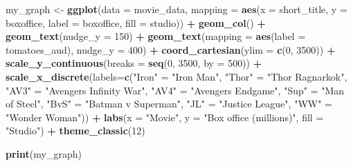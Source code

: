 \documentclass[
]{krantz}
\makeatletter
\newenvironment{Shaded}{\begin{snugshade}}{\end{snugshade}}
\newcommand{\DataTypeTok}[1]{\textcolor[rgb]{0.27,0.27,0.27}{#1}}
\newcommand{\DecValTok}[1]{\textcolor[rgb]{0.06,0.06,0.06}{#1}}
\newcommand{\KeywordTok}[1]{\textcolor[rgb]{0.27,0.27,0.27}{\textbf{#1}}}
\newcommand{\NormalTok}[1]{#1}
\newcommand{\OperatorTok}[1]{\textcolor[rgb]{0.43,0.43,0.43}{\textbf{#1}}}
\newcommand{\StringTok}[1]{\textcolor[rgb]{0.5,0.5,0.5}{#1}}
\newenvironment{kframe}{%
\medskip{}
\setlength{\fboxsep}{.8em}
 \def\at@end@of@kframe{}%
 \ifinner\ifhmode%
  \def\at@end@of@kframe{\end{minipage}}%
  \begin{minipage}{\columnwidth}%
 \fi\fi%
 \def\FrameCommand##1{\hskip\@totalleftmargin \hskip-\fboxsep
 \colorbox{shadecolor}{##1}\hskip-\fboxsep
     \hskip-\linewidth \hskip-\@totalleftmargin \hskip\columnwidth}%
 \MakeFramed {\advance\hsize-\width
   \@totalleftmargin\z@ \linewidth\hsize
   \@setminipage}}%
 {\par\unskip\endMakeFramed%
 \at@end@of@kframe}
\renewenvironment{Shaded}{\begin{kframe}}{\end{kframe}}
\makeatother
\begin{document}
\begin{Shaded}
\begin{Highlighting}[]
\NormalTok{my_graph <-}\StringTok{ }\KeywordTok{ggplot}\NormalTok{(}\DataTypeTok{data =}\NormalTok{ movie_data,}
           \DataTypeTok{mapping =} \KeywordTok{aes}\NormalTok{(}\DataTypeTok{x =}\NormalTok{ short_title,}
                         \DataTypeTok{y =}\NormalTok{ boxoffice,}
                         \DataTypeTok{label =}\NormalTok{ boxoffice, }
                         \DataTypeTok{fill =}\NormalTok{ studio)) }\OperatorTok{+}
\StringTok{  }\KeywordTok{geom_col}\NormalTok{() }\OperatorTok{+}
\StringTok{  }\KeywordTok{geom_text}\NormalTok{(}\DataTypeTok{nudge_y =} \DecValTok{150}\NormalTok{)  }\OperatorTok{+}
\StringTok{  }\KeywordTok{geom_text}\NormalTok{(}\DataTypeTok{mapping =} \KeywordTok{aes}\NormalTok{(}\DataTypeTok{label =}\NormalTok{ tomatoes_aud), }
            \DataTypeTok{nudge_y =} \DecValTok{400}\NormalTok{) }\OperatorTok{+}
\StringTok{  }\KeywordTok{coord_cartesian}\NormalTok{(}\DataTypeTok{ylim =} \KeywordTok{c}\NormalTok{(}\DecValTok{0}\NormalTok{, }\DecValTok{3500}\NormalTok{)) }\OperatorTok{+}
\StringTok{  }\KeywordTok{scale_y_continuous}\NormalTok{(}\DataTypeTok{breaks =} \KeywordTok{seq}\NormalTok{(}\DecValTok{0}\NormalTok{, }\DecValTok{3500}\NormalTok{, }\DataTypeTok{by =} \DecValTok{500}\NormalTok{)) }\OperatorTok{+}
\StringTok{  }\KeywordTok{scale_x_discrete}\NormalTok{(}\DataTypeTok{labels=}\KeywordTok{c}\NormalTok{(}\StringTok{"Iron"}\NormalTok{ =}\StringTok{ "Iron Man"}\NormalTok{, }
                            \StringTok{"Thor"}\NormalTok{ =}\StringTok{ "Thor Ragnarkok"}\NormalTok{,}
                            \StringTok{"AV3"}\NormalTok{ =}\StringTok{ "Avengers Infinity War"}\NormalTok{,}
                            \StringTok{"AV4"}\NormalTok{ =}\StringTok{ "Avengers Endgame"}\NormalTok{,}
                            \StringTok{"Sup"}\NormalTok{ =}\StringTok{ "Man of Steel"}\NormalTok{,}
                            \StringTok{"BvS"}\NormalTok{ =}\StringTok{ "Batman v Superman"}\NormalTok{,}
                            \StringTok{"JL"}\NormalTok{ =}\StringTok{ "Justice League"}\NormalTok{,}
                            \StringTok{"WW"}\NormalTok{ =}\StringTok{ "Wonder Woman"}\NormalTok{)) }\OperatorTok{+}
\StringTok{  }\KeywordTok{labs}\NormalTok{(}\DataTypeTok{x =} \StringTok{"Movie"}\NormalTok{,}
       \DataTypeTok{y =} \StringTok{"Box office (millions)"}\NormalTok{,}
       \DataTypeTok{fill =} \StringTok{"Studio"}\NormalTok{) }\OperatorTok{+}
\StringTok{  }\KeywordTok{theme_classic}\NormalTok{(}\DecValTok{12}\NormalTok{)}
  

\KeywordTok{print}\NormalTok{(my_graph)}
\end{Highlighting}
\end{Shaded}
\end{document}
